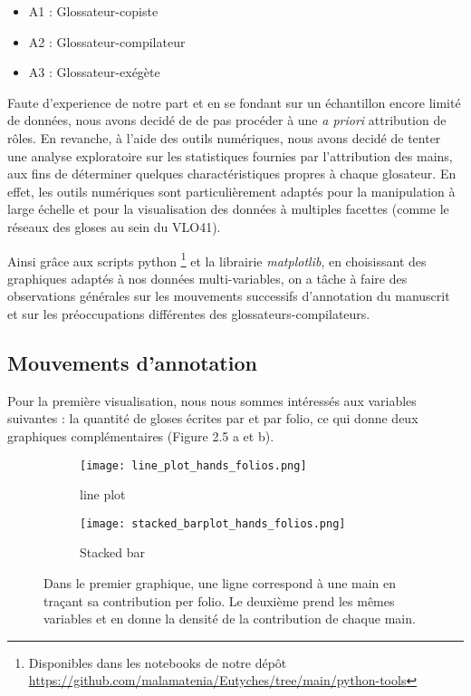 \documentclass[a4paper, twoside, 12pt]{book}
\begin{document}
\begin{itemize}
    \item A1 : Glossateur-copiste
    \item A2 : Glossateur-compilateur
    \item A3 : Glossateur-exégète
\end{itemize}

Faute d'experience de notre part et en se fondant sur un échantillon encore limité de données, nous avons decidé de de pas procéder à une \textit{a priori} attribution de rôles. En revanche, à l'aide des outils numériques, nous avons decidé de tenter une \og{} analyse exploratoire \fg{} sur les statistiques fournies par l'attribution des mains, aux fins de déterminer quelques charactéristiques propres à chaque glosateur. En effet, les outils numériques sont particulièrement adaptés pour la manipulation à large échelle et pour la visualisation des données à multiples facettes (comme le réseaux des gloses au sein du VLO41).

Ainsi grâce aux scripts python \footnote{Disponibles dans les notebooks de notre dépôt \url{https://github.com/malamatenia/Eutyches/tree/main/python-tools}} et la librairie \textit{matplotlib}, en choisissant des graphiques adaptés à nos données multi-variables, on a tâche à faire des observations générales sur les mouvements successifs d'annotation du manuscrit et sur les préoccupations différentes des glossateurs-compilateurs.\\

\subsection{Mouvements d'annotation}

Pour la première visualisation, nous nous sommes intéressés aux variables suivantes : la quantité de gloses écrites par et par folio, ce qui donne deux graphiques complémentaires (Figure 2.5 a et b).

\begin{figure}[H]
    \begin{subfigure}{0.50\textwidth}
    \centering
    \texttt{[image: line\_plot\_hands\_folios.png]}
    \caption{line plot}
    \end{subfigure}
    \begin{subfigure}{0,50\linewidth}
    \centering
    \texttt{[image: stacked\_barplot\_hands\_folios.png]}
    \caption{Stacked bar}
    \end{subfigure}
    \caption{Dans le premier graphique, une ligne correspond à une main en traçant sa contribution per folio. Le deuxième prend les mêmes variables et en donne la densité de la contribution de chaque main.}
\end{figure} 
\end{document}
